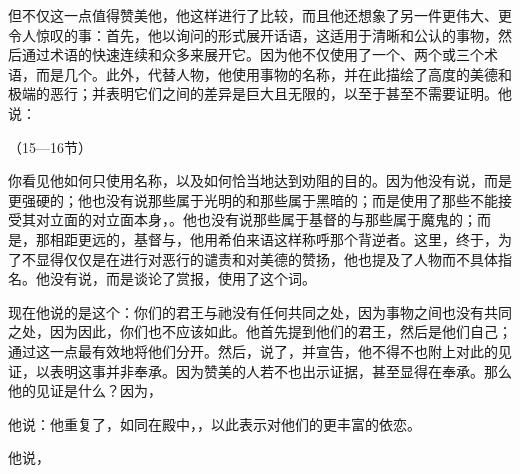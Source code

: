 但不仅这一点值得赞美他，他这样进行了比较，而且他还想象了另一件更伟大、更令人惊叹的事：首先，他以询问的形式展开话语，这适用于清晰和公认的事物，然后通过术语的快速连续和众多来展开它。因为他不仅使用了一个、两个或三个术语，而是几个。此外，代替人物，他使用事物的名称，并在此描绘了高度的美德和极端的恶行；并表明它们之间的差异是巨大且无限的，以至于甚至不需要证明。他说：\par

（15—16节）\par

你看见他如何只使用名称，以及如何恰当地达到劝阻的目的。因为他没有说，而是更强硬的；他也没有说那些属于光明的和那些属于黑暗的；而是使用了那些不能接受其对立面的对立面本身，。他也没有说那些属于基督的与那些属于魔鬼的；而是，那相距更远的，基督与，他用希伯来语这样称呼那个背逆者。这里，终于，为了不显得仅仅是在进行对恶行的谴责和对美德的赞扬，他也提及了人物而不具体指名。他没有说，而是谈论了赏报，使用了这个词。\par

现在他说的是这个：你们的君王与祂没有任何共同之处，因为事物之间也没有共同之处，因为因此，你们也不应该如此。他首先提到他们的君王，然后是他们自己；通过这一点最有效地将他们分开。然后，说了，并宣告，他不得不也附上对此的见证，以表明这事并非奉承。因为赞美的人若不也出示证据，甚至显得在奉承。那么他的见证是什么？因为，\par

他说：他重复了，如同在殿中，，以此表示对他们的更丰富的依恋。\par

他说，\par


\subsection{}


